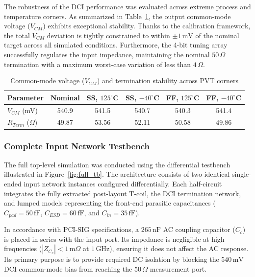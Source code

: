 The robustness of the DCI performance was evaluated across extreme process and temperature corners. As summarized in Table~\ref{tab:vcm_corners}, the output common-mode voltage ($V_{CM}$) exhibits exceptional stability. Thanks to the calibration framework, the total $V_{CM}$ deviation is tightly constrained to within $\pm 1\,\text{mV}$ of the nominal target across all simulated conditions. Furthermore, the 4-bit tuning array successfully regulates the input impedance, maintaining the nominal $50\,\Omega$ termination with a maximum worst-case variation of less than $4\,\Omega$.

\begin{table}[H]
    \centering
    \caption{Common-mode voltage ($V_{CM}$) and termination stability across PVT corners}
    \label{tab:vcm_corners}
    \begin{tabular}{@{}lccccc@{}}
        \toprule
        \textbf{Parameter} & \textbf{Nominal} & \textbf{SS, $125^\circ$C} & \textbf{SS, $-40^\circ$C} & \textbf{FF, $125^\circ$C} & \textbf{FF, $-40^\circ$C} \\
        \midrule
        $V_{CM}$ (mV) & 540.9 & 541.5 & 540.7 & 540.3 & 541.4 \\
        $R_{Term}$ ($\Omega$) & 49.87 & 53.56 & 52.11 & 50.58 & 49.86 \\
        \bottomrule
    \end{tabular}
\end{table}

\subsubsection{Complete Input Network Testbench}
 
The full top-level simulation was conducted using the differential testbench illustrated in Figure~\ref{fig:full_tb}. The architecture consists of two identical single-ended input network instances configured differentially. Each half-circuit integrates the fully extracted post-layout T-coil, the DCI termination network, and lumped models representing the front-end parasitic capacitances ($C_{pad} = 50\,\text{fF}$, $C_{ESD} = 60\,\text{fF}$, and $C_{in} = 35\,\text{fF}$).

In accordance with PCI-SIG specifications, a $265\,\text{nF}$ AC coupling capacitor ($C_c$) is placed in series with the input port. Its impedance is negligible at high frequencies ($|Z_{C_c}| < 1\,\text{m}\Omega$ at $1\,\text{GHz}$), ensuring it does not affect the AC response. Its primary purpose is to provide required DC isolation by blocking the $540\,\text{mV}$ DCI common-mode bias from reaching the $50\,\Omega$ measurement port.

